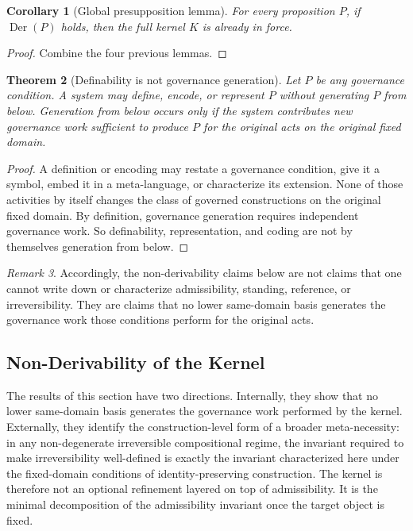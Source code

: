 \documentclass[11pt]{article}
\newtheorem{theorem}{Theorem}[section]
\newtheorem{corollary}[theorem]{Corollary}
\theoremstyle{definition}
\theoremstyle{remark}
\newtheorem{remark}[theorem]{Remark}
\newcommand{\Der}{\operatorname{Der}}
\begin{document}
\begin{corollary}[Global presupposition lemma]\label{cor:global-presupposition}
For every proposition $P$, if $\Der(P)$ holds, then the full kernel $K$ is already in force.
\end{corollary}

\begin{proof}
Combine the four previous lemmas.
\end{proof}

\begin{theorem}[Definability is not governance generation]\label{thm:definability-not-generation}
Let $P$ be any governance condition. A system may define, encode, or represent $P$ without generating $P$ from below. Generation from below occurs only if the system contributes new governance work sufficient to produce $P$ for the original acts on the original fixed domain.
\end{theorem}

\begin{proof}
A definition or encoding may restate a governance condition, give it a symbol, embed it in a meta-language, or characterize its extension. None of those activities by itself changes the class of governed constructions on the original fixed domain. By definition, governance generation requires independent governance work. So definability, representation, and coding are not by themselves generation from below.
\end{proof}

\begin{remark}
Accordingly, the non-derivability claims below are not claims that one cannot write down or characterize admissibility, standing, reference, or irreversibility. They are claims that no lower same-domain basis generates the governance work those conditions perform for the original acts.
\end{remark}

\subsection{Non-Derivability of the Kernel}

The results of this section have two directions. Internally, they show that no lower same-domain basis generates the governance work performed by the kernel. Externally, they identify the construction-level form of a broader meta-necessity: in any non-degenerate irreversible compositional regime, the invariant required to make irreversibility well-defined is exactly the invariant characterized here under the fixed-domain conditions of identity-preserving construction. The kernel is therefore not an optional refinement layered on top of admissibility. It is the minimal decomposition of the admissibility invariant once the target object is fixed.
\end{document}
